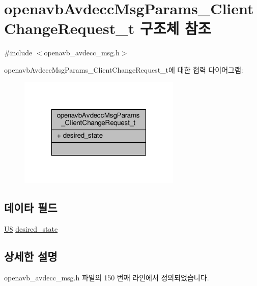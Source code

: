 \hypertarget{structopenavb_avdecc_msg_params___client_change_request__t}{}\section{openavb\+Avdecc\+Msg\+Params\+\_\+\+Client\+Change\+Request\+\_\+t 구조체 참조}
\label{structopenavb_avdecc_msg_params___client_change_request__t}


{\ttfamily \#include $<$openavb\+\_\+avdecc\+\_\+msg.\+h$>$}



openavb\+Avdecc\+Msg\+Params\+\_\+\+Client\+Change\+Request\+\_\+t에 대한 협력 다이어그램\+:
\nopagebreak
\begin{figure}[H]
\begin{center}
\leavevmode
\includegraphics[width=219pt]{structopenavb_avdecc_msg_params___client_change_request__t__coll__graph}
\end{center}
\end{figure}
\subsection*{데이타 필드}
\begin{DoxyCompactItemize}
\item 
\hyperlink{openavb__types__base__pub_8h_aa63ef7b996d5487ce35a5a66601f3e73}{U8} \hyperlink{structopenavb_avdecc_msg_params___client_change_request__t_aee37f0f9bbbc6430abe622740f953405}{desired\+\_\+state}
\end{DoxyCompactItemize}


\subsection{상세한 설명}


openavb\+\_\+avdecc\+\_\+msg.\+h 파일의 150 번째 라인에서 정의되었습니다.




